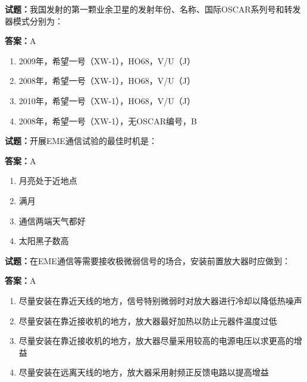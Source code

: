 \documentclass{ctexbook}
\begin{document}




\vspace{1em}

\textbf{试题：}我国发射的第一颗业余卫星的发射年份、名称、国际OSCAR系列号和转发器模式分别为： 

\textbf{答案：}A 

\begin{enumerate}[leftmargin=3em]
  \item 2009年，希望一号（XW-1），HO68，V/U（J） 

  \item 2008年，希望一号（XW-1），HO68，V/U（J） 

  \item 2010年，希望一号（XW-1），HO68，V/U（J） 

  \item 2008年，希望一号（XW-1），无OSCAR编号，B 

\end{enumerate}






\vspace{1em}

\textbf{试题：}开展EME通信试验的最佳时机是： 

\textbf{答案：}A 

\begin{enumerate}[leftmargin=3em]
  \item 月亮处于近地点 

  \item 满月 

  \item 通信两端天气都好 

  \item 太阳黑子数高 

\end{enumerate}





\vspace{1em}

\textbf{试题：}在EME通信等需要接收极微弱信号的场合，安装前置放大器时应做到： 

\textbf{答案：}A 

\begin{enumerate}[leftmargin=3em]
  \item 尽量安装在靠近天线的地方，信号特别微弱时对放大器进行冷却以降低热噪声 

  \item 尽量安装在靠近接收机的地方，放大器最好加热以防止元器件温度过低 

  \item 尽量安装在靠近接收机的地方，放大器尽量采用较高的电源电压以求更高的增益 

  \item 尽量安装在远离天线的地方，放大器采用射频正反馈电路以提高增益 

\end{enumerate}
\end{document}
